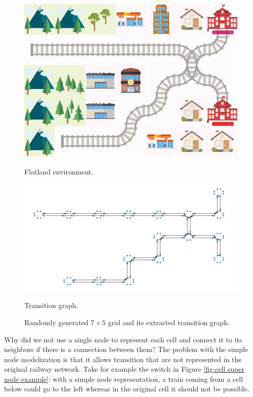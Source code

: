 \documentclass[14pt,a4paper]{article}
\theoremstyle{definition}
\numberwithin{equation}{subsection}
\begin{document}
\begin{figure}[h]
	\begin{minipage}{0.3\linewidth}
		
		
		
		\includegraphics[width=\linewidth]{img/env.png}
		\caption*{Flatland environment.}
		\label{fig:env}
	\end{minipage}
	\begin{minipage}{0.6\linewidth}
		\includegraphics[width=\linewidth]{img/env_graph.jpg}
		\caption*{Transition graph.}
	\end{minipage}
	\caption{Randomly generated $7 \times 5$ grid and its extracted transition graph.}
	\label{fig:both}
\end{figure}


Why did we not use a single node to represent each cell and connect it to its neighbors if there is a connection between them? The problem with the simple node modelization is that it allows transition that are not represented in the original railway network. Take for example the switch in Figure \ref{fig:cell super node example}: with a simple node representation, a train coming from a cell below could go to the left whereas in the original cell it should not be possible.
\newline
\end{document}
